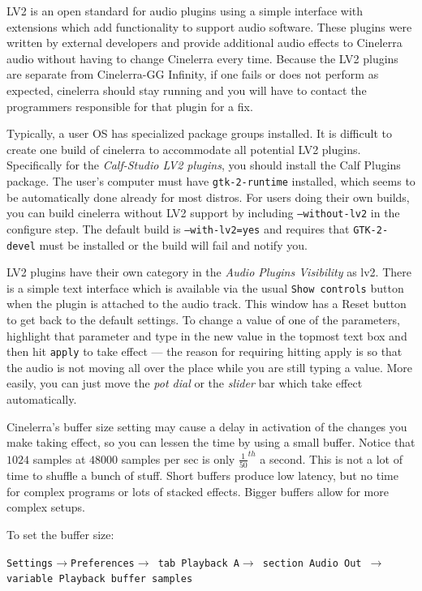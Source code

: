 LV2 is an open standard for audio plugins using a simple interface with extensions which add functionality to support audio software. These plugins were written by external developers and provide additional audio effects to Cinelerra audio without having to change Cinelerra every time. Because the LV2 plugins are separate from Cinelerra-GG Infinity, if one fails or does not perform as expected, cinelerra should stay running and you will have to contact the programmers responsible for that plugin for a fix.

Typically, a user OS has specialized package groups installed. It is difficult to create one build of cinelerra to accommodate all potential LV2 plugins. Specifically for the \textit{Calf-Studio LV2 plugins}, you should install the Calf Plugins package. The user’s computer must have \texttt{gtk-2-runtime} installed, which seems to be automatically done already for most distros. For users doing their own builds, you can build cinelerra without LV2 support by including \texttt{--without-lv2} in the configure step. The default build is \texttt{--with-lv2=yes} and requires that \texttt{GTK-2-devel} must be installed or the build will fail and notify you.

LV2 plugins have their own category in the \textit{Audio Plugins Visibility} as lv2. There is a simple text interface which is available via the usual \texttt{Show controls} button when the plugin is attached to the audio track. This window has a Reset button to get back to the default settings. To change a value of one of the parameters, highlight that parameter and type in the new value in the topmost text box and then hit \texttt{apply} to take effect --- the reason for requiring hitting apply is so that the audio is not moving all over the place while you are still typing a value. More easily, you can just move the \textit{pot dial} or the \textit{slider} bar which take effect automatically. 

Cinelerra’s buffer size setting may cause a delay in activation of the changes you make taking effect, so you can lessen the time by using a small buffer. Notice that $1024$ samples at $48000$ samples per sec is only $\frac{1}{50}^{th}$ a second. This is not a lot of time to shuffle a bunch of stuff. Short buffers produce low latency, but no time for complex programs or lots of stacked effects. Bigger buffers allow for more complex setups.

To set the buffer size:

\texttt{Settings$\rightarrow$Preferences$\rightarrow$ tab Playback A$\rightarrow$ section Audio Out $\rightarrow$ \\
variable Playback buffer samples}


